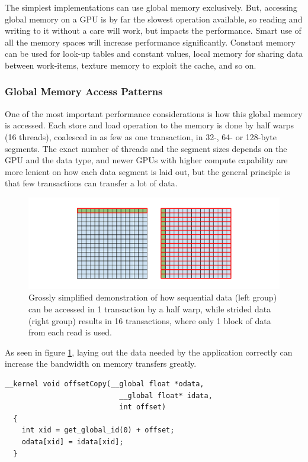 The simplest implementations can use global memory exclusively. But, accessing
global memory on a GPU is by far the slowest operation available, so reading
and writing to it without a care will work, but impacts the performance. Smart
use of all the memory spaces will increase performance significantly. Constant
memory can be used for look-up tables and constant values, local memory for
sharing data between work-items, texture memory to exploit the cache, and so
on.

\subsubsection{Global Memory Access Patterns}
\label{sect:global-memory-optimization}

One of the most important performance considerations is how this global memory
is accessed. Each store and load operation to the memory is done by half warps
(16 threads), coalesced in as few as one transaction, in 32-, 64- or 128-byte
segments. The exact number of threads and the segment sizes depends on the GPU
and the data type, and newer GPUs with higher compute capability are more
lenient on how each data segment is laid out, but the general principle is
that few transactions can transfer a lot of data.

\begin{figure}[h]
  \includegraphics[width=\textwidth]{images/coalesced-access.pdf}
  \caption{Grossly simplified demonstration of how sequential data
    (left group) can be accessed in 1 transaction by a half warp,
    while strided data (right group) results in 16 transactions, where
    only 1 block of data from each read is used.}
  \label{fig:execution-model-figure}
\end{figure}

As seen in figure \ref{fig:execution-model-figure}, laying out the
data needed by the application correctly can increase the bandwidth on
memory transfers greatly.

\begin{lstlisting}[label={lst:coalesced_test}, caption=Copy kernel
  with offset argument]
  __kernel void offsetCopy(__global float *odata,
                           __global float* idata,
                           int offset)
  {
    int xid = get_global_id(0) + offset;
    odata[xid] = idata[xid];
  }
\end{lstlisting}

